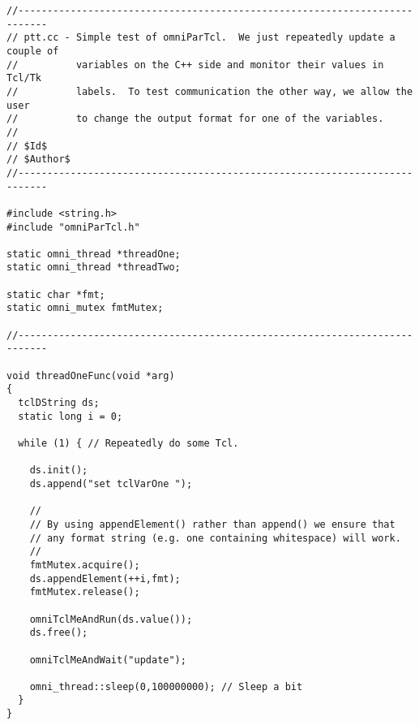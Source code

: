 \documentclass[11pt]{article}
\begin{document}
\newpage
\begin{verbatim}
//---------------------------------------------------------------------------
// ptt.cc - Simple test of omniParTcl.  We just repeatedly update a couple of 
//          variables on the C++ side and monitor their values in Tcl/Tk 
//          labels.  To test communication the other way, we allow the user 
//          to change the output format for one of the variables.
//
// $Id$
// $Author$
//---------------------------------------------------------------------------

#include <string.h>
#include "omniParTcl.h"

static omni_thread *threadOne;
static omni_thread *threadTwo;

static char *fmt;
static omni_mutex fmtMutex;

//---------------------------------------------------------------------------

void threadOneFunc(void *arg)
{
  tclDString ds;
  static long i = 0;
  
  while (1) { // Repeatedly do some Tcl.
      
    ds.init();
    ds.append("set tclVarOne ");

    //
    // By using appendElement() rather than append() we ensure that
    // any format string (e.g. one containing whitespace) will work.
    //
    fmtMutex.acquire();
    ds.appendElement(++i,fmt);      
    fmtMutex.release();    
    
    omniTclMeAndRun(ds.value());
    ds.free();
      
    omniTclMeAndWait("update");
    
    omni_thread::sleep(0,100000000); // Sleep a bit
  }
}
\end{verbatim}
\newpage
\end{document}
